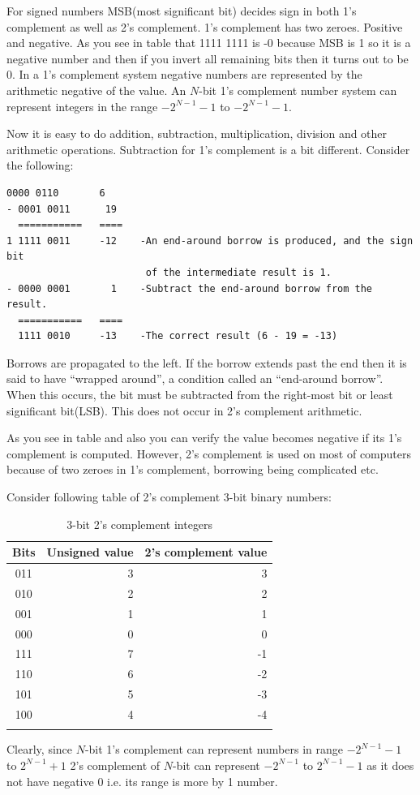 For signed numbers MSB(most significant bit) decides sign in both 1's
complement as well as 2's complement. 1's complement has two zeroes. Positive
and negative. As you see in table that 1111 1111 is -0 because MSB is 1 so it
is a negative number and then if you invert all remaining bits then it turns
out to be 0. In a 1's complement system negative numbers are represented by the
arithmetic negative of the value. An $N$-bit 1's complement number system can
represent integers in the range $-2^{N-1} - 1$ to $-2^{N-1} - 1$.

Now it is easy to do addition, subtraction, multiplication, division and other
arithmetic operations. Subtraction for 1's complement is a bit
different. Consider the following:

\begin{Verbatim}[frame=single]
  0000 0110       6
- 0001 0011      19
  ===========   ====
1 1111 0011     -12    -An end-around borrow is produced, and the sign bit
                        of the intermediate result is 1.
- 0000 0001       1    -Subtract the end-around borrow from the result.
  ===========   ====
  1111 0010     -13    -The correct result (6 - 19 = -13)
\end{Verbatim}

Borrows are propagated to the left. If the borrow extends past the end then it
is said to have ``wrapped around'', a condition called an ``end-around
borrow''. When this occurs, the bit must be subtracted from the right-most bit
or least significant bit(LSB). This does not occur in 2's complement arithmetic.

As you see in table and also you can verify the value becomes negative if its
1's complement is computed. However, 2's complement is used on most of
computers because of two zeroes in 1's complement, borrowing being complicated
etc. 

Consider following table of 2's complement 3-bit binary numbers:

  \begin{center}
    \begin{longtable}{|c|r|r|}
      \hline
      \textbf{Bits}&\textbf{Unsigned value}&\textbf{2's complement value}\\
      \hline
      011&3&3\\
      \hline
      010&2&2\\
      \hline
      001&1&1\\
      \hline
      000&0&0\\
      \hline
      111&7&-1\\
      \hline
      110&6&-2\\
      \hline
      101&5&-3\\
      \hline
      100&4&-4\\
      \hline
    \caption{3-bit 2's complement integers}
    \end{longtable}
  \end{center}
Clearly, since $N$-bit 1's complement can represent numbers in range
$-2^{N-1}-1$ to $2^{N-1} + 1$ 2's complement of $N$-bit can represent
$-2^{N-1}$ to $2^{N-1} - 1$ as it does not have negative 0 i.e. its range is
more by 1 number.

